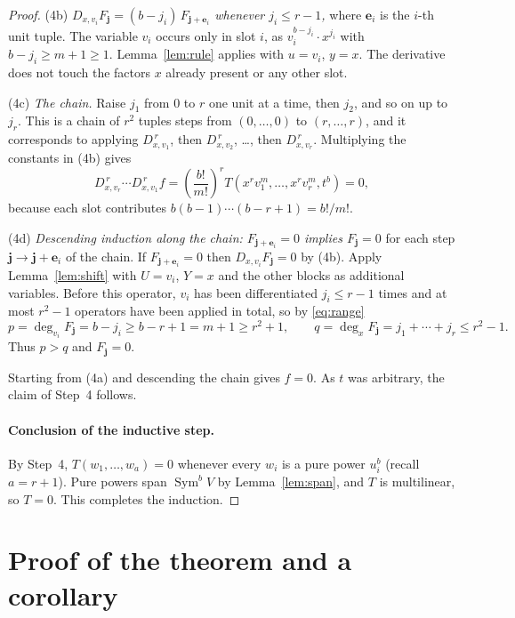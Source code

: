 \documentclass[11pt]{article}
\theoremstyle{definition}
\theoremstyle{remark}
\DeclareMathOperator{\Sym}{Sym}
\newcommand{\D}[2]{D_{#1,#2}}
\begin{document}
\begin{proof}
(4b) \emph{$\D x{v_i}F_{\mathbf j}=(b-j_i)\,F_{\mathbf j+\mathbf e_i}$
whenever $j_i\le r-1$,} where $\mathbf e_i$ is the $i$-th unit tuple. The
variable $v_i$ occurs only in slot $i$, as $v_i^{b-j_i}\cdot x^{j_i}$ with
$b-j_i\ge m+1\ge1$. Lemma~\ref{lem:rule} applies with $u=v_i$, $y=x$. The
derivative does not touch the factors $x$ already present or any other
slot.

(4c) \emph{The chain.} Raise $j_1$ from $0$ to $r$ one unit at a time,
then $j_2$, and so on up to $j_r$. This is a chain of $r^2$ tuples steps
from $(0,\ldots,0)$ to $(r,\ldots,r)$, and it corresponds to applying
$\D x{v_1}^{\,r}$, then $\D x{v_2}^{\,r}$, \ldots, then $\D x{v_r}^{\,r}$.
Multiplying the constants in (4b) gives
\begin{equation}\label{eq:second-composition}
 \D{x}{v_r}^{\,r}\cdots\D{x}{v_1}^{\,r}f
 =\left(\frac{b!}{m!}\right)^r
 T(x^rv_1^m,\ldots,x^rv_r^m,t^b)=0,
\end{equation}
because each slot contributes $b(b-1)\cdots(b-r+1)=b!/m!$.

(4d) \emph{Descending induction along the chain: $F_{\mathbf j+\mathbf
e_i}=0$ implies $F_{\mathbf j}=0$} for each step
$\mathbf j\to\mathbf j+\mathbf e_i$ of the chain. If
$F_{\mathbf j+\mathbf e_i}=0$ then $\D x{v_i}F_{\mathbf j}=0$ by (4b). Apply
Lemma~\ref{lem:shift} with $U=v_i$, $Y=x$ and the other blocks as additional
variables. Before this operator, $v_i$ has been differentiated
$j_i\le r-1$ times and at most $r^2-1$ operators have been applied in
total, so by \eqref{eq:range}
\[
 p=\deg_{v_i}F_{\mathbf j}=b-j_i\ge b-r+1=m+1\ge r^2+1,
 \qquad
 q=\deg_xF_{\mathbf j}=j_1+\cdots+j_r\le r^2-1 .
\]
Thus $p>q$ and $F_{\mathbf j}=0$.

Starting from (4a) and descending the chain gives $f=0$. As $t$ was
arbitrary, the claim of Step~4 follows.

\paragraph{Conclusion of the inductive step.}
By Step~4, $T(w_1,\ldots,w_a)=0$ whenever every $w_i$ is a pure power
$u_i^b$ (recall $a=r+1$). Pure powers span $\Sym^bV$ by
Lemma~\ref{lem:span}, and $T$ is multilinear, so $T=0$. This completes the
induction.
\end{proof}

\section{Proof of the theorem and a corollary}\label{sec:comparison}
\end{document}
